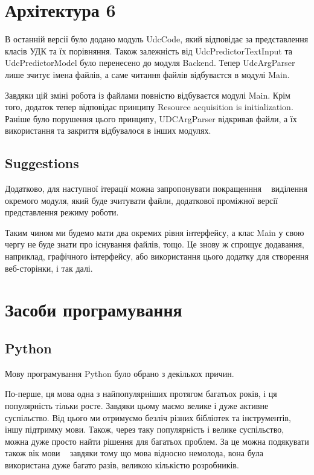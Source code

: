 \documentclass{article}
\let\oldsection\section
\renewcommand{\section}{\clearpage\oldsection}
\begin{document}
\section{Архітектура 6}
В останній версії було додано модуль UdcCode, який відповідає за представлення
класів УДК та їх порівняння. Також залежність від UdcPredictorTextInput
та UdcPredictorModel було перенесено до модуля Backend.
Тепер UdcArgParser лише зчитує імена файлів, а саме читання файлів відбуваєтся
в модулі Main.

Завдяки цій зміні робота із файлами повністю відбуваєтся модулі Main.
Крім того, додаток тепер відповідає принципу Resource acquisition is initialization.
Раніше було порушення цього принципу, UDCArgParser відкривав файли, 
а їх використання та закриття відбувалося в інших модулях.

\subsection{Suggestions}
Додатково, для наступної ітерації можна запропонувати покращенння \textemdash~
виділення окремого модуля, який буде зчитувати файли, додаткової проміжної
версії представлення режиму роботи.

Таким чином ми будемо мати два окремих рівня інтерфейсу,
а клас Main у свою чергу не буде знати про існування файлів, тощо.
Це знову ж спрощує додавання, наприклад, графічного інтерфейсу,
або використання цього додатку для створення веб-сторінки, і так далі.

\section{Засоби програмування}

\subsection{Python}
Мову програмування Python було обрано з декількох причин.

По-перше, ця мова одна з найпопулярніших протягом багатьох років,
і ця популярність тільки росте.
Завдяки цьому маємо велике і дуже активне суспільство.
Від цього ми отримуємо безліч різних бібліотек та інструментів, іншу підтримку мови.
Також, через таку популярність і велике суспільство,
можна дуже просто найти рішення для багатьох проблем.
За це можна подякувати також вік мови \textemdash~
завдяки тому що мова відносно немолода, вона була використана дуже багато разів,
великою кількістю розробників.
\end{document}
